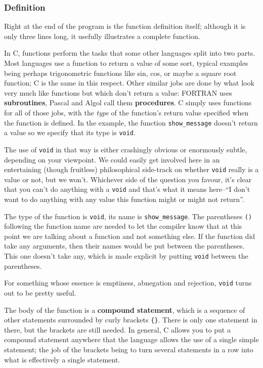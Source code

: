    

   \subsubsection{Definition}
    

    Right at the end of the program is the function definition itself;
     although it is only three lines long, it usefully illustrates a complete
     function.


    In C, functions perform the tasks that some other languages split into
     two parts. Most languages use a function to return a value of some sort,
     typical examples being perhaps trigonometric functions like sin, cos, or
     maybe a square root function; C is the same in this respect. Other similar
     jobs are done by what look very much like functions but which don't return
     a value: FORTRAN uses \textbf{subroutines}, Pascal and Algol call them
     \textbf{procedures}. C simply uses functions for all of those jobs, with
     the \textit{type} of the function's return value specified when the
     function is defined. In the example, the function
     \texttt{show\_message} doesn't return a value so we specify that its
     type is \texttt{void}.


    The use of \texttt{void} in that way is either crashingly obvious or
     enormously subtle, depending on your viewpoint. We could easily get
     involved here in an entertaining (though fruitless) philosophical
     side-track on whether \texttt{void} really is a value or not, but we
     won't. Whichever side of the question you favour, it's clear that you
     can't do anything with a \texttt{void} and that's what it means
     here--``I don't want to do anything with any value this function
     might or might not return''.


    The type of the function is \texttt{void}, its name is
     \texttt{show\_message}. The parentheses \texttt{()} following
     the function name are needed to let the compiler know that at this point
     we are talking about a function and not something else. If the function
     did take any arguments, then their names would be put between the
     parentheses. This one doesn't take any, which is made explicit by putting
     \texttt{void} between the parentheses.


    For something whose essence is emptiness, abnegation and rejection,
     \texttt{void} turns out to be pretty useful.


    The body of the function is a \textbf{compound statement}, which is a
     sequence of other statements surrounded by curly
     brackets \texttt{\{\}}. There is only one statement in there, but
     the brackets are still needed. In general, C allows you to put a compound
     statement anywhere that the language allows the use of a single simple
     statement; the job of the brackets being to turn several statements in a
     row into what is effectively a single statement.


